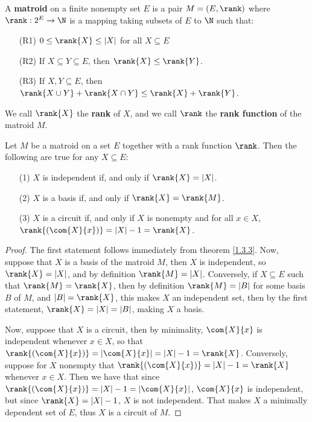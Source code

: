 \begin{definition}
    A \textbf{matroid} on a finite nonempty set $E$ is a pair  $M=(E,\rank)$
    where $\rank:2^E \rightarrow \N$ is a mapping taking subsets of $E$ to  $\N$
    such that:
    \begin{enumerate}
        \item[(R1)] $0 \leq \rank{X} \leq |X|$ for all $X \subseteq E$

        \item[(R2)] If $X \subseteq Y \subseteq E$, then  $\rank{X} \leq
            \rank{Y}$.
        \item[(R3)] If $X,Y \subseteq E$, then  $\rank{X \cup Y}+\rank{X \cap Y}
            \leq \rank{X} + \rank{Y}$.
    \end{enumerate}
    We call $\rank{X}$ the \textbf{rank} of $X$, and we call  $\rank$ the
    \textbf{rank function} of the matroid $M$.
\end{definition}

\begin{theorem}\label{1.3.4}
    Let $M$ be a matroid on a set  $E$ together with a rank function  $\rank$.
    Then the following are true for any $X \subseteq E$:
    \begin{enumerate}
        \item[(1)] $X$ is independent if, and only if  $\rank{X}=|X|$.

        \item[(2)] $X$ is a basis if, and only if  $\rank{X}=\rank{M}$.

        \item[(3)] $X$ is a circuit if, and only if  $X$ is nonempty and for all
             $x \in X$,  $\rank{(\com{X}{x})}=|X|-1=\rank{X}$.
    \end{enumerate}
\end{theorem}
\begin{proof}
    The first statement follows immediately from theorem \ref{1.3.3}. Now,
    suppose that $X$ is a basis of the matroid $M$, then $X$ is independent, so
     $\rank{X}=|X|$, and by definition $\rank{M}=|X|$. Conversely, if $X
     \subseteq E$ such that  $\rank{M}=\rank{X}$, then by definition
     $\rank{M}=|B|$ for some basis $B$ of  $M$, and $|B|=\rank{X}$, this makes
     $X$ an independent set, then by the first statement,  $\rank{X}=|X|=|B|$,
     making $X$ a basis.

     Now, suppose that $X$ is a circuit, then by minimality, $\com{X}{x}$ is
     independent whenever $x \in X$, so that
     $\rank{(\com{X}{x})}=|\com{X}{x}|=|X|-1=\rank{X}$. Conversely, suppose for
     $X$ nonempty that  $\rank{(\com{X}{x})}=|X|-1=\rank{X}$ whenever $x \in X$.
     Then we have that since $\rank{(\com{X}{x})}=|X|-1=|\com{X}{x}|$,
     $\com{X}{x}$ is independent, but since $\rank{X}=|X|-1$, $X$ is not
     independent. That makes  $X$ a minimally dependent set of $E$, thus $X$ is
     a circuit of $M$.
\end{proof}

